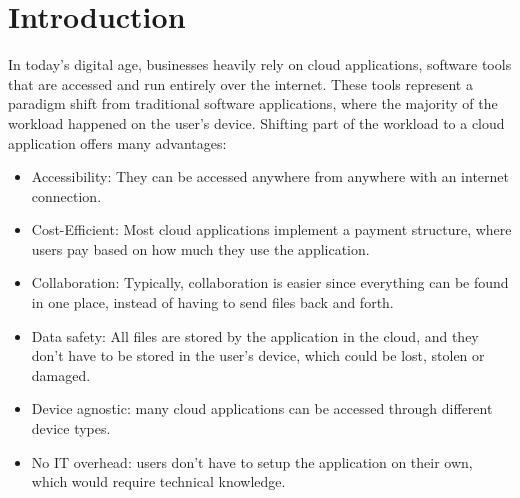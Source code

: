 \chapter{Introduction}
\label{cha:introduction}




In today's digital age, businesses heavily rely on cloud applications,
software tools that are accessed and run entirely over the internet.
These tools represent a paradigm shift from traditional software applications,
where the majority of the workload happened on the user's device.
Shifting part of the workload to a cloud application offers many advantages:

\begin{itemize}
	\item Accessibility: They can be accessed anywhere from anywhere with an internet connection.
	\item Cost-Efficient: Most cloud applications implement a payment structure, where
	      users pay based on how much they use the application.
	\item Collaboration: Typically, collaboration is easier since everything can be found
	      in one place, instead of having to send files back and forth.
	\item Data safety: All files are stored by the application in the cloud, and they don't
	      have to be stored in the user's device, which could be lost, stolen or damaged.
	\item Device agnostic: many cloud applications can be accessed through different device types.
	\item No IT overhead: users don't have to setup the application on their own, which would require technical knowledge.
\end{itemize}

